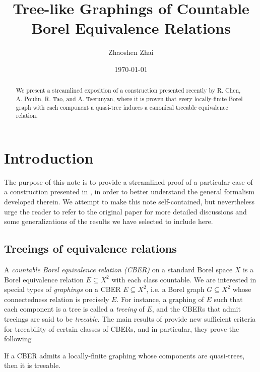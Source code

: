 \documentclass{amsart}
\begin{document}
    \title{Tree-like Graphings of Countable Borel Equivalence Relations}
    \author{Zhaoshen Zhai}
    \date{\today}

    \begin{abstract}
        We present a streamlined exposition of a construction presented recently by R. Chen, A. Poulin, R. Tao, and A. Tserunyan, where it is proven that every locally-finite Borel graph with each component a quasi-tree induces a canonical treeable equivalence relation. {\color{red}{Write some more details...}}
    \end{abstract}

    \maketitle

    \setcounter{section}{-1}
    \section{Introduction}

    The purpose of this note is to provide a streamlined proof of a particular case of a construction presented in \cite{CPTT23}, in order to better understand the general formalism developed therein. We attempt to make this note self-contained, but nevertheless urge the reader to refer to the original paper for more detailed discussions and some generalizations of the results we have selected to include here.

    \subsection{Treeings of equivalence relations}

    A \textit{countable Borel equivalence relation (CBER)} on a standard Borel space $X$ is a Borel equivalence relation $E\subseteq X^2$ with each class countable. We are interested in special types of \textit{graphings} on a CBER $E\subseteq X^2$, i.e. a Borel graph $G\subseteq X^2$ whose connectedness relation is precisely $E$. For instance, a graphing of $E$ such that each component is a tree is called a \textit{treeing} of $E$, and the CBERs that admit treeings are said to be \textit{treeable}. The main results of \cite{CPTT23} provide new sufficient criteria for treeability of certain classes of CBERs, and in particular, they prove the following

    \begin{mainTheorem}\label{thm:treeing_quasi-trees}
        If a CBER admits a locally-finite graphing whose components are quasi-trees, then it is treeable.
    \end{mainTheorem}
\end{document}
